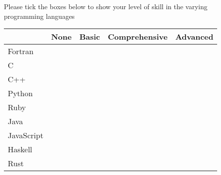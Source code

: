 %
%
Please tick the boxes below to show your level of skill in the varying programming languages
\begin{center}
\begin{tabular}{|l|c|c|c|c|}
\hline
& None & Basic & Comprehensive & Advanced \\ \hline
Fortran & & & & \\ \hline
C & & & & \\ \hline
C++ & & & & \\ \hline
Python & & & & \\ \hline
Ruby & & & & \\ \hline
Java & & & & \\ \hline
JavaScript & & & & \\ \hline
Haskell & & & & \\ \hline
Rust  & & & & \\ \hline
\end{tabular}
\end{center}

